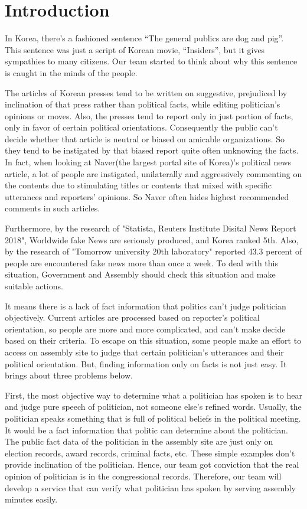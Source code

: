 \documentclass[conference]{IEEEtran}
\begin{document}
\vspace{17mm}


\section{Introduction}
In Korea, there’s a fashioned sentence “The general publics are dog and pig”. This sentence was just a script of Korean movie, “Insiders”, but it gives sympathies to many citizens. Our team started to think about why this sentence is caught in the minds of the people.
 
The articles of Korean presses tend to be written on suggestive, prejudiced by inclination of that press rather than political facts, while editing politician’s opinions or moves. Also, the presses tend to report only in just portion of facts, only in favor of certain political orientations. Consequently the public can’t decide whether that article is neutral or biased on amicable organizations. So they tend to be instigated by that biased report quite often unknowing the facts. In fact, when looking at Naver(the largest portal site of Korea)’s political news article, a lot of people are instigated, unilaterally and aggressively commenting on the contents due to stimulating titles or contents that mixed with specific utterances and reporters' opinions. So Naver often hides highest recommended comments in such articles.

Furthermore, by the research of "Statista, Reuters Institute Disital News Report 2018", Worldwide fake News are seriously produced, and Korea ranked 5th. Also, by the research of "Tomorrow university 20th laboratory" reported 43.3 percent of people are encountered fake news more than once a week. To deal with this situation, Government and Assembly should check this situation and make suitable actions.
 
It means there is a lack of fact information that politics can’t judge politician objectively. Current articles are processed based on reporter’s political orientation, so people are more and more complicated, and can’t make decide based on their criteria. To escape on this situation, some people make an effort to access on assembly site to judge that certain politician’s utterances and their political orientation. But, finding information only on facts is not just easy. It brings about three problems below.
 
First, the most objective way to determine what a politician has spoken is to hear and judge pure speech of politician, not someone else’s refined words. Usually, the politician speaks something that is full of political beliefs in the political meeting. It would be a fact information that politic can determine about the politician. The public fact data of the politician in the assembly site are just only on election records, award records, criminal facts, etc. These simple examples don’t provide inclination of the politician. Hence, our team got conviction that the real opinion of politician is in the congressional records. Therefore, our team will develop a service that can verify what politician has spoken by serving  assembly minutes easily.
 
\end{document}
